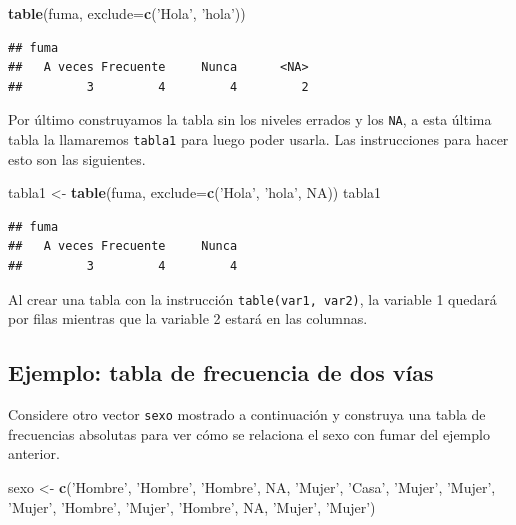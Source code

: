 \documentclass[10pt,]{krantz}
\makeatletter
\newenvironment{Shaded}{\begin{snugshade}}{\end{snugshade}}
\newcommand{\KeywordTok}[1]{\textcolor[rgb]{0.13,0.29,0.53}{\textbf{{#1}}}}
\newcommand{\DataTypeTok}[1]{\textcolor[rgb]{0.13,0.29,0.53}{{#1}}}
\newcommand{\StringTok}[1]{\textcolor[rgb]{0.31,0.60,0.02}{{#1}}}
\newcommand{\OtherTok}[1]{\textcolor[rgb]{0.56,0.35,0.01}{{#1}}}
\newcommand{\NormalTok}[1]{{#1}}
\newenvironment{kframe}{%
\medskip{}
\setlength{\fboxsep}{.8em}
 \def\at@end@of@kframe{}%
 \ifinner\ifhmode%
  \def\at@end@of@kframe{\end{minipage}}%
  \begin{minipage}{\columnwidth}%
 \fi\fi%
 \def\FrameCommand##1{\hskip\@totalleftmargin \hskip-\fboxsep
 \colorbox{shadecolor}{##1}\hskip-\fboxsep
     \hskip-\linewidth \hskip-\@totalleftmargin \hskip\columnwidth}%
 \MakeFramed {\advance\hsize-\width
   \@totalleftmargin\z@ \linewidth\hsize
   \@setminipage}}%
 {\par\unskip\endMakeFramed%
 \at@end@of@kframe}
\renewenvironment{Shaded}{\begin{kframe}}{\end{kframe}}
\let\BeginKnitrBlock\begin \let\EndKnitrBlock\end
\makeatother
\begin{document}
\begin{Shaded}
\begin{Highlighting}[]
\KeywordTok{table}\NormalTok{(fuma, }\DataTypeTok{exclude=}\KeywordTok{c}\NormalTok{(}\StringTok{'Hola'}\NormalTok{, }\StringTok{'hola'}\NormalTok{))}
\end{Highlighting}
\end{Shaded}

\begin{verbatim}
## fuma
##   A veces Frecuente     Nunca      <NA> 
##         3         4         4         2
\end{verbatim}

Por último construyamos la tabla sin los niveles errados y los
\texttt{NA}, a esta última tabla la llamaremos \texttt{tabla1} para
luego poder usarla. Las instrucciones para hacer esto son las
siguientes.

\begin{Shaded}
\begin{Highlighting}[]
\NormalTok{tabla1 <-}\StringTok{ }\KeywordTok{table}\NormalTok{(fuma, }\DataTypeTok{exclude=}\KeywordTok{c}\NormalTok{(}\StringTok{'Hola'}\NormalTok{, }\StringTok{'hola'}\NormalTok{, }\OtherTok{NA}\NormalTok{))}
\NormalTok{tabla1}
\end{Highlighting}
\end{Shaded}

\begin{verbatim}
## fuma
##   A veces Frecuente     Nunca 
##         3         4         4
\end{verbatim}

\BeginKnitrBlock{rmdnote}
Al crear una tabla con la instrucción \texttt{table(var1,\ var2)}, la
variable 1 quedará por filas mientras que la variable 2 estará en las
columnas.
\EndKnitrBlock{rmdnote}

\subsection*{Ejemplo: tabla de frecuencia de dos
vías}\label{ejemplo-tabla-de-frecuencia-de-dos-vias}

Considere otro vector \texttt{sexo} mostrado a continuación y construya
una tabla de frecuencias absolutas para ver cómo se relaciona el sexo
con fumar del ejemplo anterior.

\begin{Shaded}
\begin{Highlighting}[]
\NormalTok{sexo <-}\StringTok{ }\KeywordTok{c}\NormalTok{(}\StringTok{'Hombre'}\NormalTok{, }\StringTok{'Hombre'}\NormalTok{, }\StringTok{'Hombre'}\NormalTok{, }\OtherTok{NA}\NormalTok{, }\StringTok{'Mujer'}\NormalTok{,}
          \StringTok{'Casa'}\NormalTok{, }\StringTok{'Mujer'}\NormalTok{, }\StringTok{'Mujer'}\NormalTok{, }\StringTok{'Mujer'}\NormalTok{, }\StringTok{'Hombre'}\NormalTok{, }\StringTok{'Mujer'}\NormalTok{, }
          \StringTok{'Hombre'}\NormalTok{, }\OtherTok{NA}\NormalTok{, }\StringTok{'Mujer'}\NormalTok{, }\StringTok{'Mujer'}\NormalTok{)}
\end{Highlighting}
\end{Shaded}
\end{document}
